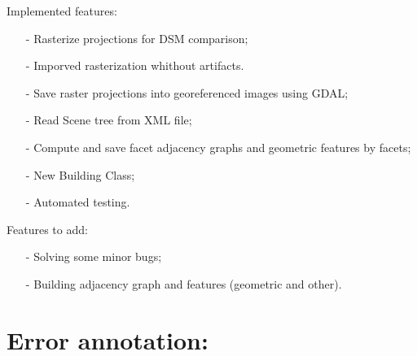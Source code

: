 \documentclass[9pt]{beamer}
\begin{document}
	\begin{frame}{Implemented features:}
		\begin{itemize}
			\item[-] Rasterize projections for DSM comparison;
			\item[-] Imporved rasterization whithout artifacts.
			\item[-] Save raster projections into georeferenced images using GDAL;
			\item[-] Read Scene tree from XML file;
			\item[-] Compute and save facet adjacency graphs and geometric features by facets;
			\item[-] New Building Class;
			\item[-] Automated testing.
		\end{itemize}
	\end{frame}
	
	\begin{frame}{Features to add:}
		\begin{itemize}
			\item[-] Solving some minor bugs;
			\item[-] Building adjacency graph and features (geometric and other).
		\end{itemize}
	\end{frame}

	\section[Annotation]{Error annotation:}
\end{document}
